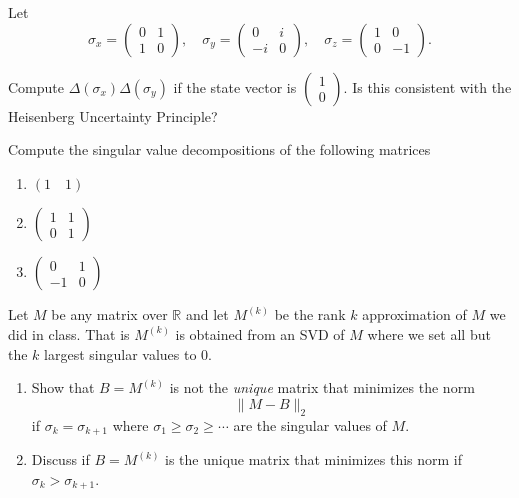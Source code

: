   \begin{exercise} 
    Let
    \begin{equation}
      \sigma_x = \begin{pmatrix} 0 & 1 \\ 1 & 0 \end{pmatrix}, \quad
          \sigma_y = \begin{pmatrix} 0 & i \\ -i & 0 \end{pmatrix}, \quad
          \sigma_z = \begin{pmatrix} 1 & 0 \\ 0 & -1 \end{pmatrix}.
    \end{equation}
    
    Compute $\Delta(\sigma_x)\Delta(\sigma_y)$ if the state vector is $\begin{pmatrix} 1 \\ 0 \end{pmatrix}$. Is this consistent with the Heisenberg Uncertainty Principle?
  \end{exercise}

  \begin{exercise} 
    Compute the singular value decompositions of the following matrices
    \begin{enumerate}
      \item $(1 \quad 1)$
      
      \item $\begin{pmatrix} 1 & 1 \\ 0 & 1 \end{pmatrix}$
      
      \item $\begin{pmatrix} 0 & 1 \\ -1 & 0 \end{pmatrix}$
    \end{enumerate}
  \end{exercise}

  \begin{exercise} 
    Let $M$ be any matrix over $\mathbb{R}$ and let $M^{(k)}$ be the rank $k$ approximation of $M$ we did in class. That is $M^{(k)}$ is obtained from an SVD of $M$ where we set all but the $k$ largest singular values to 0.
    \begin{enumerate}
      \item Show that $B = M^{(k)}$ is not the \textit{unique} matrix that minimizes the norm
      \begin{equation}
        \|M-B\|_2
      \end{equation}
      if $\sigma_k = \sigma_{k+1}$ where $\sigma_1 \geq \sigma_2 \geq \cdots$ are the singular values of $M$.
      
      \item Discuss if $B = M^{(k)}$ is the unique matrix that minimizes this norm if $\sigma_k > \sigma_{k+1}$.
    \end{enumerate}
  \end{exercise}

